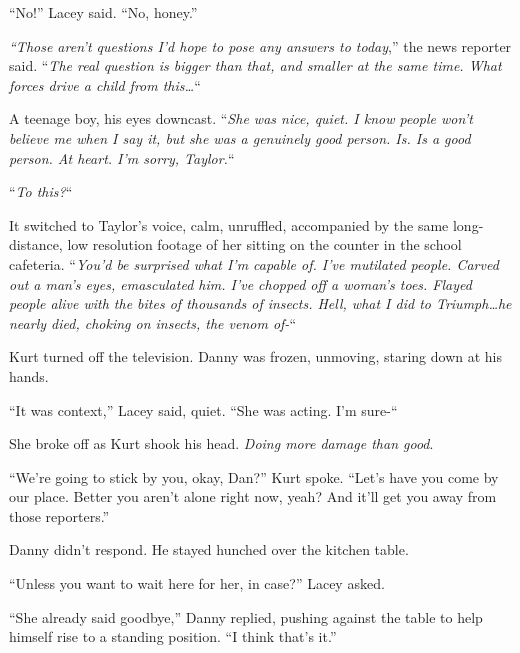 ``No!'' Lacey said.  ``No, honey.''



\emph{``Those aren't questions I'd hope to pose any answers to today},'' the news reporter said.  ``\emph{The real question is bigger than that, and smaller at the same time.  What forces drive a child from this\ldots}``



A teenage boy, his eyes downcast.  ``\emph{She was nice, quiet.  I know people won't believe me when I say it, but she was a genuinely good person.  Is.  Is a good person.  At heart.  I'm sorry, Taylor.}``



``\emph{To this?}``



It switched to Taylor's voice, calm, unruffled, accompanied by the same long-distance, low resolution footage of her sitting on the counter in the school cafeteria.  ``\emph{You'd be surprised what I'm capable of.  I've mutilated people.  Carved out a man's eyes, emasculated him.  I've chopped off a woman's toes.  Flayed people alive with the bites of thousands of insects.  Hell, what I did to Triumph\ldots he nearly died, choking on insects, the venom of-}``



Kurt turned off the television.  Danny was frozen, unmoving, staring down at his hands.



``It was context,'' Lacey said, quiet.  ``She was acting.  I'm sure-``



She broke off as Kurt shook his head.  \emph{Doing more damage than good}.



``We're going to stick by you, okay, Dan?'' Kurt spoke.  ``Let's have you come by our place.  Better you aren't alone right now, yeah?  And it'll get you away from those reporters.''



Danny didn't respond.  He stayed hunched over the kitchen table.



``Unless you want to wait here for her, in case?'' Lacey asked.



``She already said goodbye,'' Danny replied, pushing against the table to help himself rise to a standing position.  ``I think that's it.''



